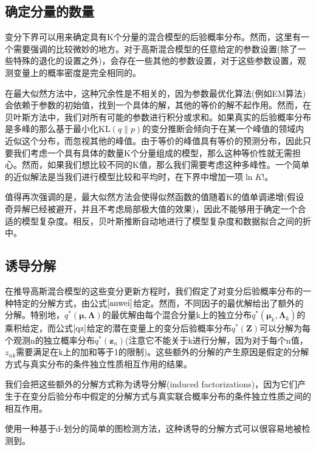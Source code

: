 \subsection*{确定分量的数量}
变分下界可以用来确定具有K个分量的混合模型的后验概率分布。然而，这里有一个需要强调的比较微妙的地方。对于高斯混合模型的任意给定的参数设置(除了一些特殊的退化的设置之外)，会存在一些其他的参数设置，对于这些参数设置，观测变量上的概率密度是完全相同的。

在最大似然方法中，这种冗余性是不相关的，因为参数最优化算法(例如EM算法)会依赖于参数的初始值，找到一个具体的解，其他的等价的解不起作用。然而，在贝叶斯方法中，我们对所有可能的参数进行积分或求和。如果真实的后验概率分布是多峰的那么基于最小化$\mathrm{KL}(q\| p)$的变分推断会倾向于在某一个峰值的领域内近似这个分布，而忽视其他的峰值。由于等价的峰值具有等价的预测分布，因此只要我们考虑一个具有具体的数量K个分量组成的模型，那么这种等价性就无需担心。然而，如果我们想比较不同的K值，那么我们需要考虑这种多峰性。一个简单的近似解法是当我们进行模型比较和平均时，在下界中增加一项$\ln K!$。

值得再次强调的是，最大似然方法会使得似然函数的值随着K的值单调递增(假设奇异解已经被避开，并且不考虑局部极大值的效果)，因此不能够用于确定一个合适的模型复杂度。相反，贝叶斯推断自动地进行了模型复杂度和数据拟合之间的折中。
\subsection*{诱导分解}
在推导高斯混合模型的这些变分更新方程时，我们假定了对变分后验概率分布的一种特定的分解方式，由公式$\ref{anwei}$给定。然而，不同因子的最优解给出了额外的分解。特别地，$q^*(\boldsymbol{\mu},\boldsymbol{\Lambda})$的最优解由每个混合分量k上的独立分布$q^*(\boldsymbol{\mu}_k,\boldsymbol{\Lambda}_k)$的乘积给定，而公式$\ref{qz}$给定的潜在变量上的变分后验概率分布$q^*(\boldsymbol{Z})$可以分解为每个观测n的独立概率分布$q^*(\boldsymbol{z}_n)$(注意它不能关于k进行分解，因为对于每个n值，$z_{nk}$需要满足在k上的加和等于1的限制)。这些额外的分解的产生原因是假定的分解方式与真实分布的条件独立性质相互作用的结果。

我们会把这些额外的分解方式称为诱导分解(induced factorizations)，因为它们产生于在变分后验分布中假定的分解方式与真实联合概率分布的条件独立性质之间的相互作用。

使用一种基于d-划分的简单的图检测方法，这种诱导的分解方式可以很容易地被检测到。